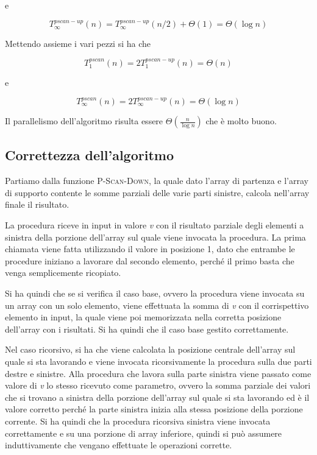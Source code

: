 e

$$
T_{\infty}^{pscan-up}(n) = T_{\infty}^{pscan-up}(n/2) + \Theta(1) = \Theta(\log n)
$$

Mettendo assieme i vari pezzi si ha che

$$
T_{1}^{pscan}(n) = 2 T_{1}^{pscan-up}(n) = \Theta(n)
$$

e

$$
T_{\infty}^{pscan}(n) = 2T_{\infty}^{pscan-up}(n) = \Theta(\log n)
$$

Il parallelismo dell'algoritmo risulta essere $\Theta(\frac{n}{\log n})$ che è molto buono.


\subsection{Correttezza dell'algoritmo}

Partiamo dalla funzione \textsc{P-Scan-Down}, la quale dato l'array di partenza e l'array di supporto contente le somme parziali delle varie parti sinistre, calcola nell'array finale il risultato.

La procedura riceve in input in valore \textit{v} con il risultato parziale degli elementi a sinistra della porzione dell'array sul quale viene invocata la procedura. La prima chiamata viene fatta utilizzando il valore in posizione 1, dato che entrambe le procedure iniziano a lavorare dal secondo elemento, perché il primo basta che venga semplicemente ricopiato.

Si ha quindi che se si verifica il caso base, ovvero la procedura viene invocata su un array con un solo elemento, viene effettuata la somma di \textit{v} con il corrispettivo elemento in input, la quale viene poi memorizzata nella corretta posizione dell'array con i risultati. Si ha quindi che il caso base gestito correttamente.

Nel caso ricorsivo, si ha che viene calcolata la posizione centrale dell'array sul quale si sta lavorando e viene invocata ricorsivamente la procedura sulla due parti destre e sinistre. Alla procedura che lavora sulla parte sinistra viene passato come valore di \textit{v} lo stesso ricevuto come parametro, ovvero la somma parziale dei valori che si trovano a sinistra della porzione dell'array sul quale si sta lavorando ed è il valore corretto perché la parte sinistra inizia alla stessa posizione della porzione corrente. Si ha quindi che la procedura ricorsiva sinistra viene invocata correttamente e su una porzione di array inferiore, quindi si può assumere induttivamente che vengano effettuate le operazioni corrette.

